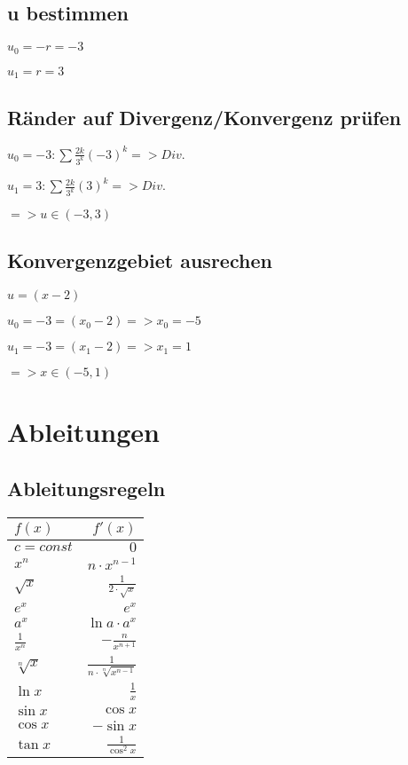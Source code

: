 \documentclass[a4paper, 11pt]{article}
\begin{document}
\subsection { u bestimmen}

$u_0 = -r = -3$

$u_1 =  r = 3$

\subsection { Ränder auf Divergenz/Konvergenz prüfen}

$u_0 = -3: \sum \frac{2k} {3^k} (-3)^k => Div.$

$u_1 = 3: \sum \frac{2k} {3^k} (3)^k => Div.$    

$=> u \in (-3, 3)$

\subsection { Konvergenzgebiet ausrechen}

$u = (x - 2)$

$u_0 = -3 = (x_0 - 2) => x_0 = -5$

$u_1 = -3 = (x_1 - 2) => x_1 = 1$

$=> x \in (-5, 1)$ 


\section{Ableitungen}


\subsection{Ableitungsregeln}
\renewcommand{\arraystretch}{1.5}

\begin{tabular}{l | r} 
	$f(x)$ & $f'(x)$\\
	\hline 
	$c = const$ & $0$\\ 
	$x^n$ & $n \cdot x^{n-1}$\\
	$\sqrt{x}$ & $\frac{1}{2\cdot\sqrt{x}}$\\
	$e^x$ & $e^x$\\
	$a^x$ & $\ln{a} \cdot a^x$\\
	$\frac{1}{x^n}$ & $- \frac{n}{x^{n+1}}$\\
	$\sqrt[n]{x}$ & $\frac{1}{n \cdot \sqrt[n]{x^{n-1}}}$\\
	$\ln{x}$ & $\frac{1}{x}$\\
	$\sin{x}$ & $\cos{x}$\\
	$\cos{x}$ & $-\sin{x}$\\
	$\tan{x}$ & $\frac{1}{\cos^2{x}}$\\
\end{tabular} 
\end{document}
